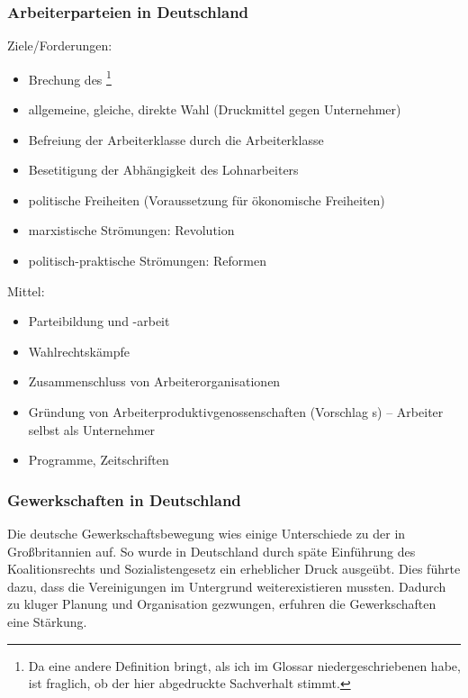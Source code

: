 \subsubsection{Arbeiterparteien in Deutschland}

Ziele/Forderungen:

\begin{itemize}
\item Brechung des \footnote{Da \cite{WiLexEhLohnGes} eine andere Definition
bringt, als ich im Glossar niedergeschriebenen habe, ist fraglich, ob
der hier abgedruckte Sachverhalt stimmt.}
\item allgemeine, gleiche, direkte Wahl (Druckmittel gegen
Unternehmer)
\item Befreiung der Arbeiterklasse durch die Arbeiterklasse
\item Besetitigung der Abhängigkeit des Lohnarbeiters
\item politische Freiheiten (Voraussetzung für ökonomische
Freiheiten)
\item marxistische Strömungen: Revolution 
\item politisch-praktische Strömungen: Reformen
\end{itemize}

Mittel:

\begin{itemize}
\item Parteibildung und -arbeit
\item Wahlrechtskämpfe
\item Zusammenschluss von Arbeiterorganisationen
\item Gründung von Arbeiterproduktivgenossenschaften (Vorschlag
s) -- Arbeiter selbst als
Unternehmer
\item Programme, Zeitschriften
\end{itemize}


\subsubsection{Gewerkschaften in Deutschland}

Die deutsche Gewerkschaftsbewegung wies einige Unterschiede zu der in
Großbritannien auf. So wurde in Deutschland durch späte Einführung des
Koalitionsrechts und Sozialistengesetz ein erheblicher Druck ausgeübt.
Dies führte dazu, dass die Vereinigungen im Untergrund
weiterexistieren mussten. Dadurch zu kluger Planung und Organisation
gezwungen, erfuhren die Gewerkschaften eine Stärkung.

